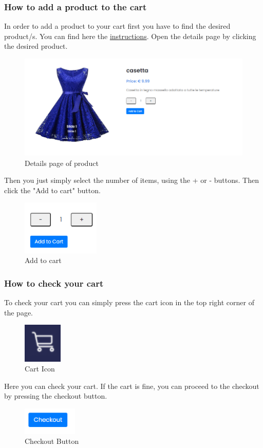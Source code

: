 \subsubsection{How to add a product to the cart} \label{_addproduct}
In order to add a product to your cart first you have to find the desired product/s. You can find here the \hyperref[_lookforproduct]{instructions}.
Open the details page by clicking the desired product.
\begin{figure}[H]
    \centering
    \includegraphics[width=40em]{res/images/cliente/pdp.png}
    \caption{Details page of product}
\end{figure}
Then you just simply select the number of items, using the + or - buttons. Then click the "Add to cart" button.
\begin{figure}[H]
    \centering
    \includegraphics[width=10em]{res/images/cliente/addtocart.png}
    \caption{Add to cart}
\end{figure}

\subsubsection{How to check your cart} \label{_checkcart}
To check your cart you can simply press the cart icon in the top right corner of the page.
\begin{figure}[H]
    \centering
    \includegraphics[width=5em]{res/images/cliente/carticon.png}
    \caption{Cart Icon}
\end{figure}
Here you can check your cart. If the cart is fine, you can proceed to the checkout by pressing the checkout button.
\begin{figure}[H]
    \centering
    \includegraphics[width=7em]{res/images/cliente/checkoutbutton.png}
    \caption{Checkout Button}
\end{figure}

